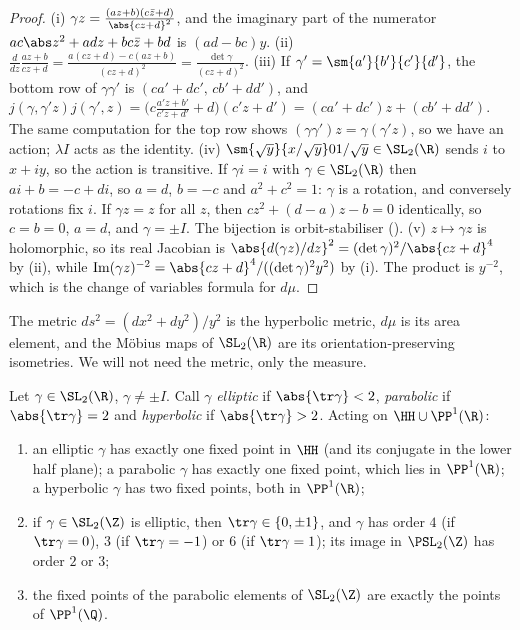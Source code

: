 \begin{proof}
(i) $\gamma z=\frac{(az+b)(c\bar z+d)}{\abs{cz+d}^2}$, and the imaginary part of the numerator $ac\abs z^2+adz+bc\bar z+bd$ is $(ad-bc)y$.
(ii) $\frac{d}{dz}\frac{az+b}{cz+d}=\frac{a(cz+d)-c(az+b)}{(cz+d)^2}=\frac{\det\gamma}{(cz+d)^2}$.
(iii) If $\gamma'=\sm{a'}{b'}{c'}{d'}$, the bottom row of $\gamma\gamma'$ is $(ca'+dc',\,cb'+dd')$, and
$j(\gamma,\gamma'z)j(\gamma',z)=\bigl(c\frac{a'z+b'}{c'z+d'}+d\bigr)(c'z+d')=(ca'+dc')z+(cb'+dd')$. The same computation for the top row shows
$(\gamma\gamma')z=\gamma(\gamma'z)$, so we have an action; $\lambda I$ acts as the identity.
(iv) $\sm{\sqrt y}{x/\sqrt y}0{1/\sqrt y}\in\SL_2(\R)$ sends $i$ to $x+iy$, so the action is transitive. If $\gamma i=i$ with $\gamma\in\SL_2(\R)$ then $ai+b=-c+di$, so
$a=d$, $b=-c$ and $a^2+c^2=1$: $\gamma$ is a rotation, and conversely rotations fix $i$. If $\gamma z=z$ for all $z$, then $cz^2+(d-a)z-b=0$ identically, so
$c=b=0$, $a=d$, and $\gamma=\pm I$. The bijection is orbit-stabiliser ().
(v) $z\mapsto\gamma z$ is holomorphic, so its real Jacobian is $\abs{d(\gamma z)/dz}^2=(\det\gamma)^2/\abs{cz+d}^4$ by (ii), while
$\operatorname{Im}(\gamma z)^{-2}=\abs{cz+d}^4/((\det\gamma)^2y^2)$ by (i). The product is $y^{-2}$, which is the change of variables formula for $d\mu$.
\end{proof}

The metric $ds^2=(dx^2+dy^2)/y^2$ is the hyperbolic metric, $d\mu$ is its area element, and the M\"obius maps of $\SL_2(\R)$ are its
orientation-preserving isometries. We will not need the metric, only the measure.

\begin{proposition}\label{prop:modforms:element-types}
Let $\gamma\in\SL_2(\R)$, $\gamma\ne\pm I$. Call $\gamma$ \emph{elliptic} if $\abs{\tr\gamma}<2$, \emph{parabolic} if $\abs{\tr\gamma}=2$ and \emph{hyperbolic} if
$\abs{\tr\gamma}>2$. Acting on $\HH\cup\PP^1(\R)$:
\begin{enumerate}[label=(\roman*)]
\item an elliptic $\gamma$ has exactly one fixed point in $\HH$ (and its conjugate in the lower half plane); a parabolic $\gamma$ has exactly one fixed point,
which lies in $\PP^1(\R)$; a hyperbolic $\gamma$ has two fixed points, both in $\PP^1(\R)$;
\item if $\gamma\in\SL_2(\Z)$ is elliptic, then $\tr\gamma\in\{0,\pm1\}$, and $\gamma$ has order $4$ (if $\tr\gamma=0$), $3$ (if $\tr\gamma=-1$) or $6$ (if $\tr\gamma=1$);
its image in $\PSL_2(\Z)$ has order $2$ or $3$;
\item the fixed points of the parabolic elements of $\SL_2(\Z)$ are exactly the points of $\PP^1(\Q)$.
\end{enumerate}
\end{proposition}

